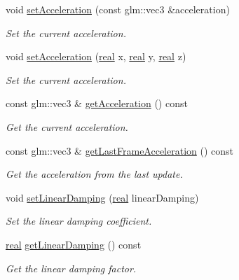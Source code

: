 \begin{DoxyCompactItemize}
void \mbox{\hyperlink{classr3_1_1_rigid_body_add57880a9a4df0d016c1639eba48350d}{set\+Acceleration}} (const glm\+::vec3 \&acceleration)
\begin{DoxyCompactList}\small\item\em Set the current acceleration. \end{DoxyCompactList}\item 
void \mbox{\hyperlink{classr3_1_1_rigid_body_a39362e0dad1d6758be86c54fc6e6b944}{set\+Acceleration}} (\mbox{\hyperlink{namespacer3_ab2016b3e3f743fb735afce242f0dc1eb}{real}} x, \mbox{\hyperlink{namespacer3_ab2016b3e3f743fb735afce242f0dc1eb}{real}} y, \mbox{\hyperlink{namespacer3_ab2016b3e3f743fb735afce242f0dc1eb}{real}} z)
\begin{DoxyCompactList}\small\item\em Set the current acceleration. \end{DoxyCompactList}\item 
const glm\+::vec3 \& \mbox{\hyperlink{classr3_1_1_rigid_body_a671c60af58aea7cff7fe3e029fa5ef71}{get\+Acceleration}} () const
\begin{DoxyCompactList}\small\item\em Get the current acceleration. \end{DoxyCompactList}\item 
const glm\+::vec3 \& \mbox{\hyperlink{classr3_1_1_rigid_body_a0107527952d289050043c9625a7818ee}{get\+Last\+Frame\+Acceleration}} () const
\begin{DoxyCompactList}\small\item\em Get the acceleration from the last update. \end{DoxyCompactList}\item 
void \mbox{\hyperlink{classr3_1_1_rigid_body_ac65bfd9fd7a12de59141fab3c02e8579}{set\+Linear\+Damping}} (\mbox{\hyperlink{namespacer3_ab2016b3e3f743fb735afce242f0dc1eb}{real}} linear\+Damping)
\begin{DoxyCompactList}\small\item\em Set the linear damping coefficient. \end{DoxyCompactList}\item 
\mbox{\hyperlink{namespacer3_ab2016b3e3f743fb735afce242f0dc1eb}{real}} \mbox{\hyperlink{classr3_1_1_rigid_body_ab48c055a703f1d3d84b9f1977ef504e6}{get\+Linear\+Damping}} () const
\begin{DoxyCompactList}\small\item\em Get the linear damping factor. \end{DoxyCompactList}\item 

\end{DoxyCompactItemize}
